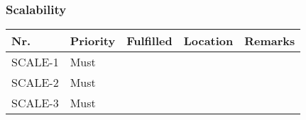 \subsubsection{Scalability}
\begin{table}[H]
	\begin{tabular}{lllll}
						    
		Nr.     & Priority & Fulfilled & Location & Remarks \\ \hline
		SCALE-1 & Must     & ~        & ~         & ~       \\ 
		SCALE-2 & Must     & ~        & ~         & ~       \\ 
		SCALE-3 & Must     & ~        & ~         & ~       \\
						
	\end{tabular}
\end{table}

\clearpage


